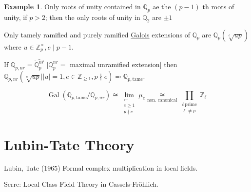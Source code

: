 \documentclass[openany]{amsbook}
\numberwithin{section}{chapter}
\theoremstyle{definition}
\newtheorem*{example}{Example}
\begin{document}
\begin{example}
    Only roots of unity contained in \(\mathbb{Q}_p\) ae the \((p-1)\) th roots of unity, if \(p > 2\); then the only roots of unity in \(\mathbb{Q}_2\) are \(\pm 1\) 
    
    Only tamely ramified and purely ramified \underline{Galois} extensions of \(\mathbb{Q}_p\) are \(\mathbb{Q}_p(\sqrt[e]{up})\) where \(u \in \mathbb{Z}_p^\times , e \mid p-1\).
    
    If \(\mathbb{Q}_{p, nr} = \widehat{\mathbb{Q}_p^{nr}}\) [\(\mathbb{Q}_p^{nr}=\) maximal unramified extension] then \(\mathbb{Q}_{p,nr}(\sqrt[e]{up} \mid \vert u \vert = 1, e \in \mathbb{Z}_{\geq 1}, p\nmid e) \eqqcolon \mathbb{Q}_{p,\text{tame}}\).
    
    \[
        \operatorname{Gal}(\mathbb{Q}_{p,\text{tame}} / \mathbb{Q}_{p,nr}) \cong \lim_{\substack{\leftarrow \\ e \geq 1 \\ p\nmid e}} \mu_e \underset{\text{non. canonical}}{\cong} \prod_{\substack{\ell\,\text{prime} \\ \ell\neq p}} \mathbb{Z}_\ell
    \]
\end{example}

\begin{center}
\end{center}

\chapter{Lubin-Tate Theory}

Lubin, Tate (1965) Formal complex multiplication in local fields.

Serre: Local Class Field Theory in Cassels-Fr\"ohlich.
\end{document}
